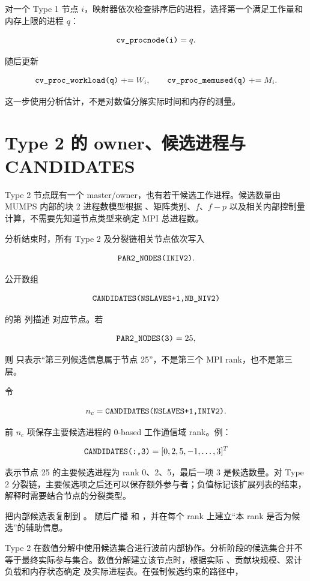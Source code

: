 对一个 Type 1 节点 $i$，映射器依次检查排序后的进程，选择第一个满足工作量和内存上限的进程 $q$：

\[
\texttt{cv\_procnode(i)}=q.
\]

随后更新

\[
\texttt{cv\_proc\_workload(q)}\mathrel{+}=W_i,
\qquad
\texttt{cv\_proc\_memused(q)}\mathrel{+}=M_i.
\]

这一步使用分析估计，不是对数值分解实际时间和内存的测量。

\section{Type 2 的 owner、候选进程与 CANDIDATES}

Type 2 节点既有一个 master/owner，也有若干候选工作进程。候选数量由 MUMPS 内部的块 2 进程数模型根据 、矩阵类别、$f$、$f-p$ 以及相关内部控制量计算，不需要先知道节点类型来确定 MPI 总进程数。

分析结束时，所有 Type 2 及分裂链相关节点依次写入

\[
\texttt{PAR2\_NODES(INIV2)}.
\]

公开数组

\[
\texttt{CANDIDATES(NSLAVES+1,NB\_NIV2)}
\]

的第  列描述  对应节点。若

\[
\texttt{PAR2\_NODES(3)}=25,
\]

则  只表示“第三列候选信息属于节点 25”，不是第三个 MPI rank，也不是第三层。

令

\[
n_c=\texttt{CANDIDATES(NSLAVES+1,INIV2)}.
\]

前 $n_c$ 项保存主要候选进程的 0-based 工作通信域 rank。例：

\[
\texttt{CANDIDATES(:,3)}=
[0,2,5,-1,\ldots,3]^T
\]

表示节点 25 的主要候选进程为 rank 0、2、5，最后一项 3 是候选数量。对 Type 2 分裂链，主要候选项之后还可以保存额外参与者；负值标记该扩展列表的结束，解释时需要结合节点的分裂类型。

 把内部候选表复制到 。 随后广播  和 ，并在每个 rank 上建立“本 rank 是否为候选”的辅助信息。

Type 2 在数值分解中使用候选集合进行波前内部协作。分析阶段的候选集合并不等于最终实际参与集合。数值分解建立该节点时，根据实际 、贡献块规模、累计负载和内存状态确定  及实际进程表。在强制候选约束的路径中，

